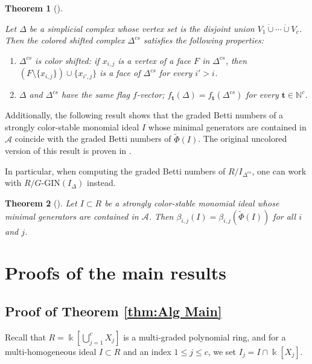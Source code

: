\documentclass[a4paper, 10pt, reqno, english, ones]{amsart}  %
\newtheorem{theorem}{Theorem}[section]
\theoremstyle{definition}
\theoremstyle{remark}
\begin{document}
\begin{theorem}[\cite{Babson2004Face}]\label{thm:shifted props}

Let $\Delta$ be a simplicial complex whose vertex set is the disjoint union $V_1\dot{\cup} \cdots \dot{\cup} V_c$. Then the colored shifted complex $\Delta^{cs}$ satisfies the following properties:
\begin{enumerate}
    \item $\Delta^{cs}$ is color shifted: if $x_{i,j}$ is a vertex of a face $F$ in $\Delta^{cs}$, then $(F\setminus \{x_{i,j}\}) \cup \{x_{i',j}\}$ is a face of $\Delta^{cs}$ for every $i'>i$.
    \item $\Delta$ and $\Delta^{cs}$ have the same flag $f$-vector; $f_{\mathbf{t}}(\Delta)=f_{\mathbf{t}}(\Delta^{cs})$ for every $\mathbf{t}\in \mathbb{N}^c$.
\end{enumerate}
    
\end{theorem}
Additionally, the following result shows that the graded Betti numbers of a strongly color-stable monomial ideal $I$ whose minimal generators are contained in $\mathscr{A}$ coincide with the graded Betti numbers of $\tilde{\Phi}(I)$. The original uncolored version of this result is proven in \cite{aramova2000shifting}.

In particular, when computing the graded Betti numbers of $R/I_{\Delta^{cs}}$, one can work with $R/G\textrm{-GIN}(I_\Delta)$ instead.

\begin{theorem}[\cite{Murai2008Betti}]\label{thm:Murai shifted betti}
    Let $I\subset R$ be a strongly color-stable monomial ideal whose minimal generators are contained in $\mathscr{A}$. Then $\beta_{i,j}(I)=\beta_{i,j}(\tilde{\Phi}(I))$ for all $i$ and $j$.
\end{theorem}

\section{Proofs of the main results}
\subsection{Proof of Theorem \ref{thm:Alg Main}}

Recall that $R=\Bbbk [\bigcup_{j=1}^c X_j]$ is a multi-graded polynomial ring, and for a multi-homogeneous ideal $I\subset R$ and an index $1\leq j\leq c$, we set $I_j=I\cap \Bbbk[X_j]$.
\end{document}

